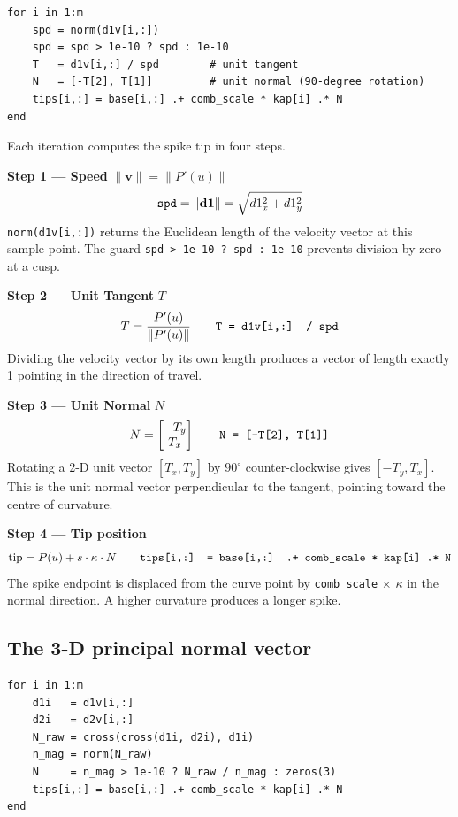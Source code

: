 \documentclass[12pt, a4paper]{article}
\newcommand{\cd}[1]{\texttt{#1}}
\begin{document}
\begin{verbatim}
for i in 1:m
    spd = norm(d1v[i,:])
    spd = spd > 1e-10 ? spd : 1e-10
    T   = d1v[i,:] / spd        # unit tangent
    N   = [-T[2], T[1]]         # unit normal (90-degree rotation)
    tips[i,:] = base[i,:] .+ comb_scale * kap[i] .* N
end
\end{verbatim}

Each iteration computes the spike tip in four steps.

\textbf{Step 1 --- Speed} $\|\mathbf{v}\| = \|P'(u)\|$
\[
  \text{\cd{spd}} = \|\mathbf{d1}\|
  = \sqrt{d1_x^2 + d1_y^2}
\]
\cd{norm(d1v[i,:])} returns the Euclidean length of the
velocity vector at this sample point.
The guard \cd{spd > 1e-10 ? spd : 1e-10} prevents
division by zero at a cusp.

\textbf{Step 2 --- Unit Tangent} $T$
\[
  T = \frac{P'(u)}{\|P'(u)\|}
  \qquad
  \text{\cd{T = d1v[i,:] / spd}}
\]
Dividing the velocity vector by its own length produces
a vector of length exactly 1 pointing in the direction
of travel.

\textbf{Step 3 --- Unit Normal} $N$
\[
  N = \begin{bmatrix}-T_y \\ T_x\end{bmatrix}
  \qquad
  \text{\cd{N = [-T[2], T[1]]}}
\]
Rotating a 2-D unit vector $[T_x, T_y]$ by
$90^{\circ}$ counter-clockwise gives $[-T_y, T_x]$.
This is the unit normal vector perpendicular to the
tangent, pointing toward the centre of curvature.

\textbf{Step 4 --- Tip position}
\[
  \text{tip} = P(u) + s \cdot \kappa \cdot N
  \qquad
  \text{\cd{tips[i,:] = base[i,:] .+ comb\_scale * kap[i] .* N}}
\]
The spike endpoint is displaced from the curve point
by \cd{comb\_scale} $\times$ $\kappa$ in the normal direction.
A higher curvature produces a longer spike.

\subsection{The 3-D principal normal vector}

\begin{verbatim}
for i in 1:m
    d1i   = d1v[i,:]
    d2i   = d2v[i,:]
    N_raw = cross(cross(d1i, d2i), d1i)
    n_mag = norm(N_raw)
    N     = n_mag > 1e-10 ? N_raw / n_mag : zeros(3)
    tips[i,:] = base[i,:] .+ comb_scale * kap[i] .* N
end
\end{verbatim}
\end{document}

